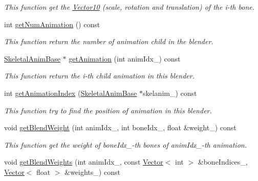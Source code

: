 \begin{DoxyCompactItemize}
\begin{DoxyCompactList}\small\item\em This function get the \hyperlink{class_i_dream_sky_1_1_vector10}{Vector10} (scale, rotation and translation) of the i-\/th bone. \end{DoxyCompactList}\item 
int \hyperlink{class_i_dream_sky_1_1_skeletal_anim_blender_ac261e7a6c3470dfa41908820ce8614db}{get\+Num\+Animation} () const 
\begin{DoxyCompactList}\small\item\em This function return the number of animation child in the blender. \end{DoxyCompactList}\item 
\hyperlink{class_i_dream_sky_1_1_skeletal_anim_base}{Skeletal\+Anim\+Base} $\ast$ \hyperlink{class_i_dream_sky_1_1_skeletal_anim_blender_a2137c37213897098baa81e124a522792}{get\+Animation} (int anim\+Idx\+\_\+) const 
\begin{DoxyCompactList}\small\item\em This function return the i-\/th child animation in this blender. \end{DoxyCompactList}\item 
int \hyperlink{class_i_dream_sky_1_1_skeletal_anim_blender_afdffb9f35a47376519e1f76320617a65}{get\+Animation\+Index} (\hyperlink{class_i_dream_sky_1_1_skeletal_anim_base}{Skeletal\+Anim\+Base} $\ast$skelanim\+\_\+) const 
\begin{DoxyCompactList}\small\item\em This function try to find the position of animation in this blender. \end{DoxyCompactList}\item 
void \hyperlink{class_i_dream_sky_1_1_skeletal_anim_blender_a8e1ebfea65b0b2a905db941a06c08ad6}{get\+Blend\+Weight} (int anim\+Idx\+\_\+, int bone\+Idx\+\_\+, float \&weight\+\_\+) const 
\begin{DoxyCompactList}\small\item\em This function get the weight of bone\+Idx\+\_\+-\/th bones of anim\+Idx\+\_\+-\/th animation. \end{DoxyCompactList}\item 
void \hyperlink{class_i_dream_sky_1_1_skeletal_anim_blender_a261d22fd30ce53a3b4eba0c74cb8d36e}{get\+Blend\+Weights} (int anim\+Idx\+\_\+, const \hyperlink{class_i_dream_sky_1_1_vector}{Vector}$<$ int $>$ \&bone\+Indices\+\_\+, \hyperlink{class_i_dream_sky_1_1_vector}{Vector}$<$ float $>$ \&weights\+\_\+) const 

\end{DoxyCompactItemize}
